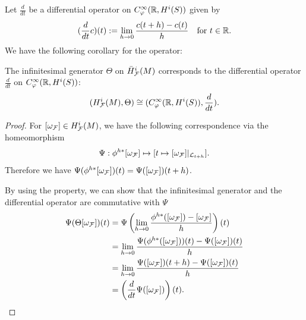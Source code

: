 Let $\frac{d}{dt}$ be a differential operator on $ C^{\infty}_{\varphi}({\mathbb{R}},H^{i}(S))$ given by
\begin{equation*}
(\frac{d}{dt}c)(t):=\lim_{h\rightarrow0}\frac{c(t+h)-c(t)}{h}\quad\mbox{for }t\in{\mathbb{R}}.
\end{equation*}
We have the following corollary for the operator:
\begin{theorem}
The infinitesimal generator $\Theta$ on  $\bar{H}^{i}_{{\mathcal{F}}}(M)$ corresponds to the differential operator $\frac{d}{dt}$ on $C^{\infty}_{\varphi}({\mathbb{R}},H^{i}(S))$:
\begin{equation*}
({H}^{i}_{{\mathcal{F}}}(M),\Theta) \cong (C^{\infty}_{\varphi}({\mathbb{R}},H^{i}(S)),\frac{d}{dt}).
\end{equation*}
\end{theorem}

\begin{proof}
For $[\omega_{{\mathcal{F}}}]\in{H}^{i}_{{\mathcal{F}}}(M)$, we have the following correspondence via the homeomorphism
    \begin{equation*}
        \Psi:\phi^{h*}[\omega_{{\mathcal{F}}}]\mapsto[t\mapsto[\omega_{{\mathcal{F}}}]|_{\mathcal{L}_{t+h}}].
    \end{equation*}
    Therefore we have $\Psi(\phi^{h*}[\omega_{{\mathcal{F}}}])(t)=\Psi([\omega_{{\mathcal{F}}}])(t+h)$.
    
    By using the property, we can show that the infinitesimal generator and the differential operator are commutative with $\Psi$
    \begin{equation*}
        \begin{split}
                \Psi(\Theta[\omega_{{\mathcal{F}}}])(t) &= \Psi\left(\lim_{h\rightarrow0} \frac{\phi^{h*}([\omega_{{\mathcal{F}}}]) - [\omega_{{\mathcal{F}}}]}{h}\right)(t)\\
                &= \lim_{h\rightarrow0}  \frac{ \Psi(\phi^{h*}([\omega_{{\mathcal{F}}}]))(t) - \Psi([\omega_{{\mathcal{F}}}])(t)}{h}\\
                &=\lim_{h\rightarrow0}  \frac{ \Psi([\omega_{{\mathcal{F}}}])(t+h) - \Psi([\omega_{{\mathcal{F}}}])(t)}{h}\\
                &=\left(\frac{d}{dt}\Psi([\omega_{{\mathcal{F}}}])\right)(t).
        \end{split}
    \end{equation*}
\end{proof}

